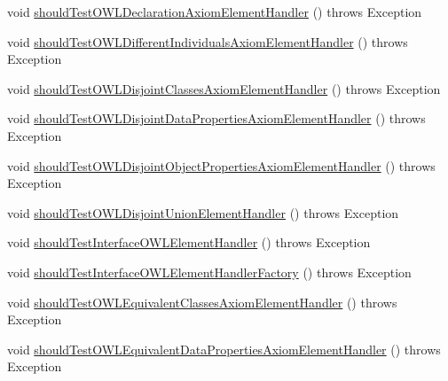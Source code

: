 \begin{DoxyCompactItemize}
void \hyperlink{classorg_1_1semanticweb_1_1owlapi_1_1contract_1_1_contract_owlxmlparser_test_a6140fc482c78bc7d999ba8a90920b182}{should\-Test\-O\-W\-L\-Declaration\-Axiom\-Element\-Handler} ()  throws Exception 
\item 
void \hyperlink{classorg_1_1semanticweb_1_1owlapi_1_1contract_1_1_contract_owlxmlparser_test_aeb19a24688157c9954b48d22ad2adbaa}{should\-Test\-O\-W\-L\-Different\-Individuals\-Axiom\-Element\-Handler} ()  throws Exception 
\item 
void \hyperlink{classorg_1_1semanticweb_1_1owlapi_1_1contract_1_1_contract_owlxmlparser_test_a68f33ab14a86acc8fe27e913dfabb638}{should\-Test\-O\-W\-L\-Disjoint\-Classes\-Axiom\-Element\-Handler} ()  throws Exception 
\item 
void \hyperlink{classorg_1_1semanticweb_1_1owlapi_1_1contract_1_1_contract_owlxmlparser_test_a6e63990a50cfe2706668b3e494c316e7}{should\-Test\-O\-W\-L\-Disjoint\-Data\-Properties\-Axiom\-Element\-Handler} ()  throws Exception 
\item 
void \hyperlink{classorg_1_1semanticweb_1_1owlapi_1_1contract_1_1_contract_owlxmlparser_test_ae03f8e34863b00c45dd6c7cdf1c89b6b}{should\-Test\-O\-W\-L\-Disjoint\-Object\-Properties\-Axiom\-Element\-Handler} ()  throws Exception 
\item 
void \hyperlink{classorg_1_1semanticweb_1_1owlapi_1_1contract_1_1_contract_owlxmlparser_test_adff645d35c23a9bceff04f39f0224d0a}{should\-Test\-O\-W\-L\-Disjoint\-Union\-Element\-Handler} ()  throws Exception 
\item 
void \hyperlink{classorg_1_1semanticweb_1_1owlapi_1_1contract_1_1_contract_owlxmlparser_test_a5fd3d499e2bdd5dcf21b76776dba1656}{should\-Test\-Interface\-O\-W\-L\-Element\-Handler} ()  throws Exception 
\item 
void \hyperlink{classorg_1_1semanticweb_1_1owlapi_1_1contract_1_1_contract_owlxmlparser_test_a0ba6d5bbbb8757fdef80669baf2af278}{should\-Test\-Interface\-O\-W\-L\-Element\-Handler\-Factory} ()  throws Exception 
\item 
void \hyperlink{classorg_1_1semanticweb_1_1owlapi_1_1contract_1_1_contract_owlxmlparser_test_a4093780f697953860b473ed03081fa00}{should\-Test\-O\-W\-L\-Equivalent\-Classes\-Axiom\-Element\-Handler} ()  throws Exception 
\item 
void \hyperlink{classorg_1_1semanticweb_1_1owlapi_1_1contract_1_1_contract_owlxmlparser_test_a205f35eaf2a4ac9829234c959c76b5ec}{should\-Test\-O\-W\-L\-Equivalent\-Data\-Properties\-Axiom\-Element\-Handler} ()  throws Exception 
\item 

\end{DoxyCompactItemize}
